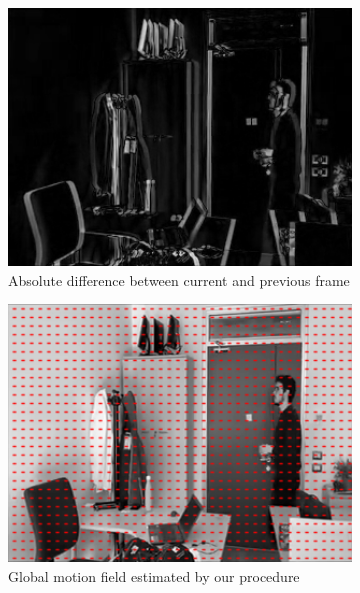\begin{figure}[htbp]
    \begin{subfigure}[b]{0.3\textwidth}
        \centering
        \includegraphics[width=1\textwidth]{../assets/images/04-diff-curr-prev-1.png}
        \caption{Absolute difference between current and previous frame}
        \label{fig:diff-curr-prev}
    \end{subfigure}
    \hfill
    \begin{subfigure}[b]{0.3\textwidth}
        \includegraphics[width=1\textwidth]{../assets//images/04-camera-motion-1.png}
        \caption{Global motion field estimated by our procedure}
        \label{fig:est-mf}
    \end{subfigure}
    \hfill
    \begin{subfigure}[b]{0.3\textwidth}

\end{subfigure}
\end{figure}
